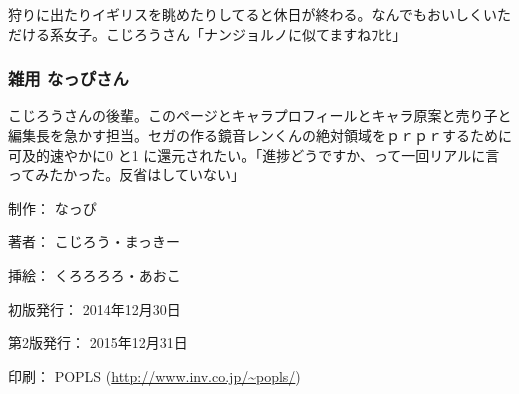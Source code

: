 \documentclass[8pt,b5paper,tombo,openany]{jsbook}
\begin{document}
\begin{flushleft}
\begin{minipage}{0.5\hsize}
\begin{scriptsize}
狩りに出たりイギリスを眺めたりしてると休日が終わる。なんでもおいしくいただける系女子。こじろうさん「ナンジョルノに似てますねﾌﾋﾋ」

\subsubsection*{雑用 なっぴさん}

こじろうさんの後輩。このページとキャラプロフィールとキャラ原案と売り子と編集長を急かす担当。セガの作る鏡音レンくんの絶対領域をｐｒｐｒするために可及的速やかに0 と1 に還元されたい。「進捗どうですか、って一回リアルに言ってみたかった。反省はしていない」

\end{scriptsize}
\end{minipage}
\end{flushleft}

\begin{flushright}
\begin{minipage}{0.5\hsize}
\begin{small}
\begin{description}
  \item{制作：} なっぴ
  \item{著者：} こじろう・まっきー
  \item{挿絵：} くろろろろ・あおこ
  \item{初版発行：} 2014年12月30日
  \item{第2版発行：} 2015年12月31日
  \item{印刷：} POPLS (\url{http://www.inv.co.jp/~popls/})
\end{description}
\end{small}
\end{minipage}
\end{flushright}

\newpage
\end{document}
